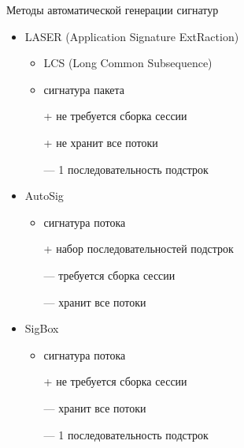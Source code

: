 \documentclass[10pt]{beamer}
\begin{document}
\begin{frame}{Методы автоматической генерации сигнатур}
    \begin{itemize}
        \item \alert{LASER} (Application Signature ExtRaction)
        \begin{itemize}
            \item \alert{LCS} (Long Common Subsequence)
            \item сигнатура пакета
            \item[+] не требуется сборка сессии
            \item[+] не хранит все потоки
            \item[---] 1 последовательность подстрок
        \end{itemize}
        \item AutoSig
        \begin{itemize}
            \item сигнатура потока
            \item[+] набор последовательностей подстрок
            \item[---] требуется сборка сессии
            \item[---] хранит все потоки
        \end{itemize}
        \item SigBox
        \begin{itemize}
            \item сигнатура потока
            \item[+] не требуется сборка сессии
            \item[---] хранит все потоки
            \item[---] 1 последовательность подстрок
        \end{itemize}
    \end{itemize}

\end{frame}
\end{document}
